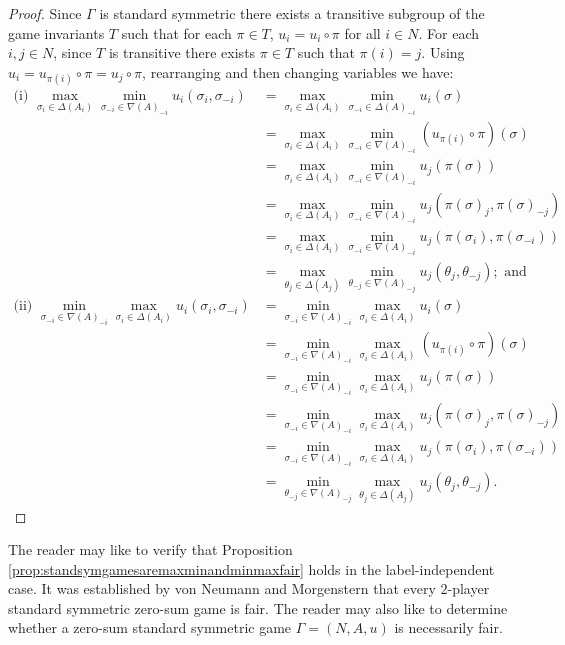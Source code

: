 \begin{proposition}
	\begin{proof}
		Since $\Gamma$ is standard symmetric there exists a transitive subgroup of the game invariants $T$ such that for each $\pi \in T$, $u_i = u_i \circ \pi$ for all $i \in N$. For each $i, j \in N$, since $T$ is transitive there exists $\pi \in T$ such that $\pi(i) = j$. Using $u_i = u_{\pi(i)} \circ \pi = u_j \circ \pi$, rearranging and then changing variables we have:
		\begin{align*}
			\text{(i) }\max_{\sigma_i \in \Delta(A_i)}\min_{\sigma_{-i} \in {\nabla(A)}_{-i}} u_i(\sigma_i, \sigma_{-i}) &= \max_{\sigma_i \in \Delta(A_i)}\min_{\sigma_{-i} \in \Delta(A)_{-i}} u_i(\sigma) \\
			&= \max_{\sigma_i \in \Delta(A_i)}\min_{\sigma_{-i} \in {\nabla(A)}_{-i}} (u_{\pi(i)} \circ \pi)(\sigma) \\
			&= \max_{\sigma_i \in \Delta(A_i)}\min_{\sigma_{-i} \in {\nabla(A)}_{-i}} u_j\left(\pi(\sigma)\right) \\
			&= \max_{\sigma_i \in \Delta(A_i)}\min_{\sigma_{-i} \in {\nabla(A)}_{-i}} u_j\left(\pi(\sigma)_j, \pi(\sigma)_{-j}\right) \\
			&= \max_{\sigma_i \in \Delta(A_i)}\min_{\sigma_{-i} \in {\nabla(A)}_{-i}} u_j\left(\pi(\sigma_i), \pi(\sigma_{-i})\right) \\
			&= \max_{\theta_j \in \Delta(A_j)}\min_{\theta_{-j} \in {\nabla(A)}_{-j}} u_j(\theta_j, \theta_{-j}); \text{ and} \\
			\text{(ii) }\min_{\sigma_{-i} \in {\nabla(A)}_{-i}}\max_{\sigma_i \in \Delta(A_i)} u_i(\sigma_i, \sigma_{-i}) &= \min_{\sigma_{-i} \in {\nabla(A)}_{-i}}\max_{\sigma_i \in \Delta(A_i)} u_i(\sigma) \\
			&= \min_{\sigma_{-i} \in {\nabla(A)}_{-i}}\max_{\sigma_i \in \Delta(A_i)} (u_{\pi(i)} \circ \pi)(\sigma) \\
			&= \min_{\sigma_{-i} \in {\nabla(A)}_{-i}}\max_{\sigma_i \in \Delta(A_i)} u_j\left(\pi(\sigma)\right) \\
			&= \min_{\sigma_{-i} \in {\nabla(A)}_{-i}}\max_{\sigma_i \in \Delta(A_i)} u_j\left(\pi(\sigma)_j, \pi(\sigma)_{-j}\right) \\
			&= \min_{\sigma_{-i} \in {\nabla(A)}_{-i}}\max_{\sigma_i \in \Delta(A_i)} u_j\left(\pi(\sigma_i), \pi(\sigma_{-i})\right) \\
			&= \min_{\theta_{-j} \in {\nabla(A)}_{-j}}\max_{\theta_j \in \Delta(A_j)} u_j(\theta_j, \theta_{-j}). 
		\end{align*} 
	\end{proof}
\end{proposition}

The reader may like to verify that Proposition \ref{prop:standsymgamesaremaxminandminmaxfair} holds in the label-independent case. It was established by von Neumann and Morgenstern \cite[Pages 165-166]{VNM} that every $2$-player standard symmetric zero-sum game is fair. The reader may also like to determine whether a zero-sum standard symmetric game $\Gamma = (N, A, u)$ is necessarily fair.
